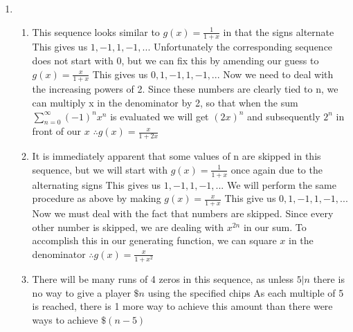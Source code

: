 \documentclass{article}
\begin{document}
\begin{enumerate}
		\item
		\begin{enumerate}
			\item This sequence looks similar to $g(x)=\frac{1}{1+x}$ in that the signs alternate
			\newline This gives us $1,-1,1,-1,...$
			\newline Unfortunately the corresponding sequence does not start with 0, but we can fix this by amending our guess to $g(x)=\frac{x}{1+x}$
			\newline This gives us $0,1,-1,1,-1,...$
			\newline Now we need to deal with the increasing powers of 2. Since these numbers are clearly tied to n, we can multiply x in the denominator by 2, so that when the sum $\sum\limits_{n=0}^{\infty}(-1)^nx^n$ is evaluated we will get $(2x)^n$ and subsequently $2^n$ in front of our $x$
			\newline $\therefore g(x)=\frac{x}{1+2x}$ 
			
			\newpage
			\item It is immediately apparent that some values of n are skipped in this sequence, but we will start with $g(x)=\frac{1}{1+x}$ once again due to the alternating signs
			\newline This gives us $1,-1,1,-1,...$
			\newline We will perform the same procedure as above by making $g(x)=\frac{x}{1+x}$
			\newline This give us $0,1,-1,1,-1,...$
			\newline Now we must deal with the fact that numbers are skipped. Since every other number is skipped, we are dealing with $x^{2n}$ in our sum. To accomplish this in our generating function, we can square $x$ in the denominator
			\newline $\therefore g(x)=\frac{x}{1+x^2}$
			
			\item There will be many runs of 4 zeros in this sequence, as unless $5|n$ there is no way to give a player $\$n$ using the specified chips
			\newline As each multiple of 5 is reached, there is 1 more way to achieve this amount than there were ways to achieve $\$(n-5)$
		\end{enumerate}
		
	\end{enumerate}
\end{document}
